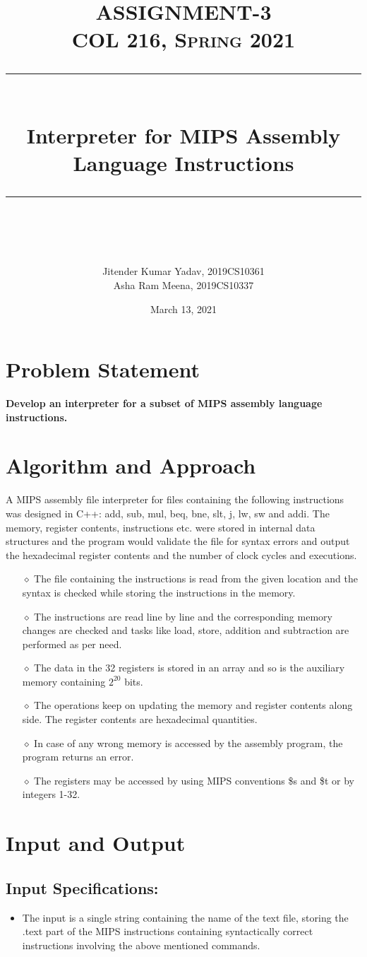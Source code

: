 \documentclass{article} %
\title{
\normalfont \large
\textsc{ASSIGNMENT-3
\vspace{10pt}
\\COL 216, Spring 2021} \\
[10pt] 
\rule{\linewidth}{0.5pt} \\[6pt] 
\Large Interpreter for MIPS Assembly Language Instructions \\
\rule{\linewidth}{2pt}  \\[10pt]
}
\author{Jitender Kumar Yadav, 2019CS10361
\\Asha Ram Meena, 2019CS10337}
\date{\normalsize March 13, 2021}
\begin{document}
\maketitle
\section{Problem Statement}
\textbf{Develop an interpreter for a subset of MIPS assembly language instructions.}

\section{Algorithm and Approach}
A MIPS assembly file interpreter for files containing the following instructions was designed in C++: add, sub, mul, beq, bne, slt, j, lw, sw and addi. The memory, register contents, instructions etc. were stored in internal data structures and the program would validate the file for syntax errors and output the hexadecimal register contents and the number of clock cycles and executions.
\begin{itemize}
    \item[$\diamond$] The file containing the instructions is read from the given location and the syntax is checked while storing the instructions in the memory.
    \item[$\diamond$] The instructions are read line by line and the corresponding memory changes are checked and tasks like load, store, addition and subtraction are performed as per need.
    \item[$\diamond$] The data in the 32 registers is stored in an array and so is the auxiliary memory containing $2^{20}$ bits.
    \item[$\diamond$] The operations keep on updating the memory and register contents along side. The register contents are hexadecimal quantities.
    \item[$\diamond$] In case of any wrong memory is accessed by the assembly program, the program returns an error.
    \item[$\diamond$] The registers may be accessed by using MIPS conventions \$s and \$t or by integers 1-32.
\end{itemize}

\section{Input and Output}
\subsection{Input Specifications:}
\begin{itemize}
    \item The input is a single string containing the name of the text file, storing the .text part of the MIPS instructions containing syntactically correct instructions involving the above mentioned commands.
\end{itemize}
\end{document}
